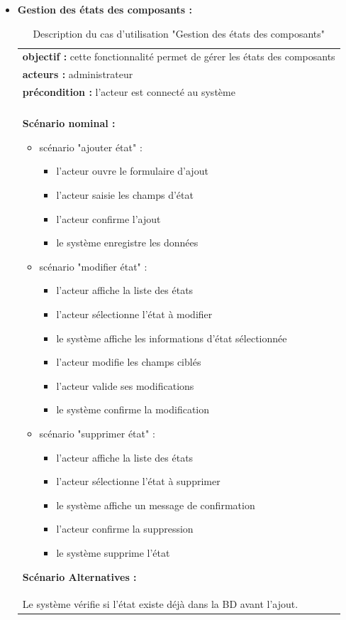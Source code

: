 \begin{itemize}[label=\textbullet]
\newpage
\item \textbf{Gestion des états des composants :}\\
\begin{table}[!h]
\begin{tabular}{|p{15cm}|}%
\rowcolor{shadecolor}\multicolumn{1}{|c|}{Sommaire d’indentification} \\
\hline
\textbf{objectif : } cette fonctionnalité permet de gérer les états des composants\\
\textbf{acteurs : } administrateur\\
\textbf{précondition : } l'acteur est connecté au système\\
\hline
\rowcolor{shadecolor}\multicolumn{1}{|c|}{Description des scénarios} \\
\hline
	\textbf{Scénario nominal :}
	\begin{itemize}[label=\textbullet]
	\item scénario "ajouter état" :
		\begin{itemize}
		\item l'acteur ouvre le formulaire d'ajout
		\item l'acteur saisie les champs d'état
		\item l'acteur confirme l'ajout
		\item le système enregistre les données
		\end{itemize}
	\item scénario "modifier état" :
		\begin{itemize}
		\item l'acteur affiche la liste des états
		\item l'acteur sélectionne l'état à modifier
		\item le système affiche les informations d'état sélectionnée
		\item l'acteur modifie les champs ciblés
		\item l'acteur valide ses modifications
		\item le système confirme la modification
		\end{itemize}
	\item scénario "supprimer état" :
		\begin{itemize}
		\item l'acteur affiche la liste des états
		\item l'acteur sélectionne l'état à supprimer
		\item le système affiche un message de confirmation
		\item l'acteur confirme la suppression
		\item le système supprime l'état
		\end{itemize}
	\end{itemize}
	\textbf{Scénario Alternatives  :}\\
	Le système vérifie si l'état existe déjà dans la BD avant l’ajout.\\
\hline
\end{tabular}
\centering \caption{Description du cas d’utilisation "Gestion des états des composants"} \label{TablePR}
\end{table}


\end{itemize}